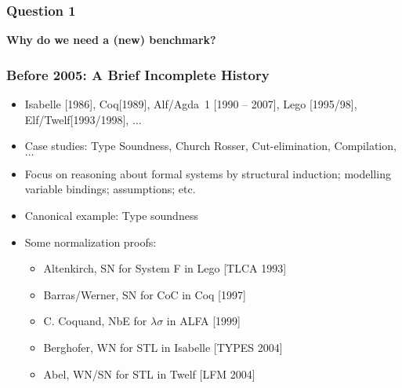 \begin{frame}\frametitle{Question 1}%
\vspace{4em}
\begin{center}
\LARGE\textbf
{Why do we need a (new) benchmark?}
\end{center}
\end{frame}

\begin{frame}\frametitle{Before 2005: A Brief Incomplete History}%
\begin{itemize}
\item Isabelle [1986], Coq[1989], Alf/Agda~1 [1990 -- 2007], Lego [1995/98], Elf/Twelf[1993/1998], $\ldots$
\item Case studies: Type Soundness, Church Rosser, Cut-elimination, Compilation, $\ldots$
\item Focus on reasoning about formal systems by structural induction; modelling variable bindings; assumptions; etc.
\item Canonical example: Type soundness
\item Some normalization proofs:
  \begin{itemize}
  \item Altenkirch, SN for System F in Lego [TLCA 1993]
  \item Barras/Werner, SN for CoC in Coq [1997]
  \item C. Coquand, NbE for $\lambda\sigma$ in ALFA [1999]
  \item Berghofer, WN for STL in Isabelle [TYPES 2004]
  \item Abel, WN/SN for STL in Twelf [LFM 2004]
  \end{itemize}
\end{itemize}


\end{frame}
